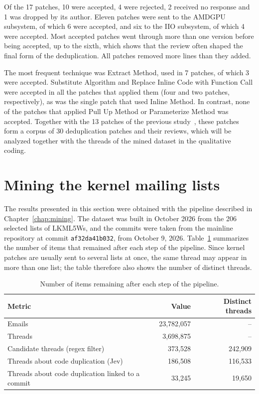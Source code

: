 Of the 17 patches, 10 were accepted, 4 were rejected, 2 received no response and 1 was dropped by its author. Eleven patches were sent to the AMDGPU subsystem, of which 6 were accepted, and six to the IIO subsystem, of which 4 were accepted. Most accepted patches went through more than one version before being accepted, up to the sixth, which shows that the review often shaped the final form of the deduplication. All patches removed more lines than they added.

The most frequent technique was Extract Method, used in 7 patches, of which 3 were accepted. Substitute Algorithm and Replace Inline Code with Function Call were accepted in all the patches that applied them (four and two patches, respectively), as was the single patch that used Inline Method. In contrast, none of the patches that applied Pull Up Method or Parameterize Method was accepted. Together with the 13 patches of the previous study~\parencite{arcanjo2026repeat}, these patches form a corpus of 30 deduplication patches and their reviews, which will be analyzed together with the threads of the mined dataset in the qualitative coding.

\section{Mining the kernel mailing lists}
\label{sec:results-mining}

The results presented in this section were obtained with the pipeline described in Chapter~\ref{chap:mining}. The dataset was built in October 2026 from the 206 selected lists of LKML5Ws, and the commits were taken from the mainline repository at commit \texttt{af32da41b032}, from October 9, 2026. Table~\ref{tab:results-overview} summarizes the number of items that remained after each step of the pipeline. Since kernel patches are usually sent to several lists at once, the same thread may appear in more than one list; the table therefore also shows the number of distinct threads.

\begin{table}[htbp]
    \centering
    \caption{Number of items remaining after each step of the pipeline.}
    \label{tab:results-overview}
    \begin{tabular}{lrr}
        \hline
        Metric & Value & Distinct threads \\
        \hline
        Emails                                  & 23,782,057 & --      \\
        Threads                                 & 3,698,875  & --      \\
        Candidate threads (regex filter)        & 373,528    & 242,909 \\
        Threads about code duplication (Jev)    & 186,508    & 116,533 \\
        Threads about code duplication linked to a commit & 33,245 & 19,650 \\
        \hline
    \end{tabular}
\end{table}

